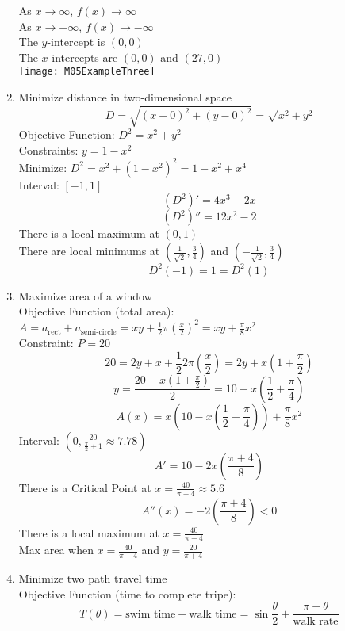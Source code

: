 \documentclass{article}
\begin{document}
\begin{enumerate}
    As $x \to \infty$, $f(x) \to \infty$ \\
    As $x \to -\infty$, $f(x) \to -\infty$ \\
    The $y$-intercept is $(0, 0)$ \\
    The $x$-intercepts are $(0, 0)$ and $(27, 0)$ \\
    \texttt{[image: M05ExampleThree]}
    \item Minimize distance in two-dimensional space
    $$D = \sqrt{\left(x - 0\right)^2 + \left(y - 0\right)^2} = \sqrt{x^2 + y^2}$$
    Objective Function: $D^2 = x^2 + y^2$ \\
    Constraints: $y = 1 - x^2$ \\
    Minimize: $D^2 = x^2 + \left(1 - x^2\right)^2 = 1 - x^2 + x^4$ \\
    Interval: $[-1, 1]$
    $$\left(D^2\right)' = 4x^3 - 2x$$
    $$\left(D^2\right)'' = 12x^2 - 2$$
    There is a local maximum at $(0, 1)$ \\
    There are local minimums at $(\frac{1}{\sqrt{2}}, \frac{3}{4})$ and $(-\frac{1}{\sqrt{2}}, \frac{3}{4})$ \\
    $$D^2(-1) = 1 = D^2(1)$$
    \item Maximize area of a window \\
    Objective Function (total area): $A = a_{\text{rect}} + a_{\text{semi-circle}} = xy + \frac{1}{2}\pi\left(\frac{x}{2}\right)^2 = xy + \frac{\pi}{8}x^2$ \\
    Constraint: $P = 20$ \\
    $$20 = 2y + x + \frac{1}{2}2\pi\left(\frac{x}{2}\right) = 2y + x\left(1 + \frac{\pi}{2}\right)$$
    $$y = \frac{20 - x\left(1 + \frac{\pi}{2}\right)}{2} = 10 - x\left(\frac{1}{2} + \frac{\pi}{4}\right)$$
    $$A(x) = x\left(10 - x\left(\frac{1}{2} + \frac{\pi}{4}\right)\right) + \frac{\pi}{8}x^2$$
    Interval: $\left(0, \frac{20}{\frac{\pi}{2} + 1} \approx 7.78\right)$
    $$A' = 10 - 2x\left(\frac{\pi + 4}{8}\right)$$
    There is a Critical Point at $x = \frac{40}{\pi + 4} \approx 5.6$
    $$A''(x) = -2\left(\frac{\pi + 4}{8}\right) < 0$$
    There is a local maximum at $x = \frac{40}{\pi + 4}$ \\
    Max area when $x = \frac{40}{\pi + 4}$ and $y = \frac{20}{\pi + 4}$
    \item Minimize two path travel time \\
        Objective Function (time to complete tripe): $$T(\theta) = \text{swim time} + \text{walk time} = \sin{\frac{\theta}{2}} + \frac{\pi - \theta}{\text{walk rate}}$$ \\

\end{enumerate}
\end{document}
